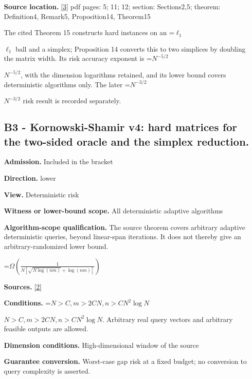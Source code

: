 \documentclass[10pt,a4paper]{article}
\newcommand{\AtlasMath}[1]{\par\begingroup\centering\setbox0=\hbox{$\displaystyle #1$}\ifdim\wd0>1.4\linewidth\typeout{ATLAS WIDE FORMULA: \the\wd0}\fi\ifdim\wd0>\linewidth\resizebox{\linewidth}{!}{\box0}\else\box0\fi\par\endgroup}
\newcommand{\AtlasInlineMath}[1]{\begingroup\setbox0=\hbox{$#1$}\ifdim\wd0>.4\linewidth\endgroup\AtlasMath{#1}\else\endgroup$#1$\fi}
\begin{document}
\textbf{Source location.} \href{https://raw.githubusercontent.com/mlresearch/v291/main/assets/kornowski25a/kornowski25a.pdf}{[3]} pdf pages: 5; 11; 12; section: Sections2,5; theorem: Definition4, Remark5, Proposition14, Theorem15



The cited Theorem 15 constructs hard instances on an \AtlasInlineMath{\ell_1} ball and a simplex; Proposition 14 converts this to two simplices by doubling the matrix width. Its risk accuracy exponent is \AtlasInlineMath{N^{-5/2}}, with the dimension logarithms retained, and its lower bound covers deterministic algorithms only. The later \AtlasInlineMath{N^{-3/2}} risk result is recorded separately.



\subsection{B3 - Kornowski-Shamir v4: hard matrices for the two-sided oracle and the simplex reduction.}


\textbf{Admission.} Included in the bracket



\textbf{Direction.} lower



\textbf{View.} Deterministic risk



\textbf{Witness or lower-bound scope.} All deterministic adaptive algorithms



\textbf{Algorithm-scope qualification.} The source theorem covers arbitrary adaptive deterministic queries, beyond linear-span iterations. It does not thereby give an arbitrary-randomized lower bound.



\AtlasMath{\Omega\!\left(\frac{1}{N[\sqrt{N\log(nm)}+\log(nm)]}\right)}


\textbf{Sources.} \href{https://arxiv.org/pdf/2412.06990v4}{[2]}



\textbf{Conditions.} \AtlasInlineMath{N>C,m>2CN,n>CN^2\log N}. Arbitrary real query vectors and arbitrary feasible outputs are allowed.



\textbf{Dimension conditions.} High-dimensional window of the source



\textbf{Guarantee conversion.} Worst-case gap risk at a fixed budget; no conversion to query complexity is asserted.
\end{document}
